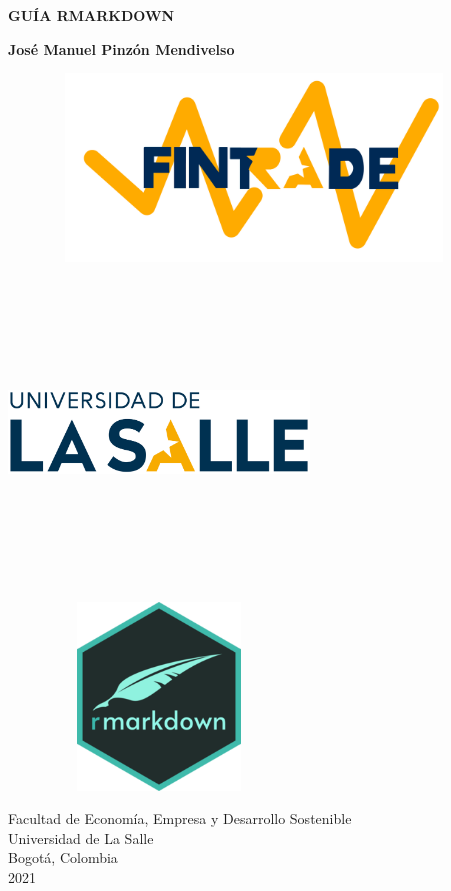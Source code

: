 \begin{titlepage}
    \begin{center}
        \vspace*{1cm}
            
        \Huge
        \textbf{GUÍA RMARKDOWN}
            
        \vspace{0.5cm}
        \LARGE
        \textbf{José Manuel Pinzón Mendivelso}
				
				\includegraphics[width=13cm,height=5cm]{Fintrade}    
            
            
        \vspace{0.5cm}
										
        \includegraphics[width=8cm,height=8cm]{LOGO}    

        \vspace{1.5cm}

        \includegraphics[width=8cm,height=5cm]{logo_rmd}
				
				\vfill
						
        \Large
        Facultad de Economía, Empresa y Desarrollo Sostenible\\
        Universidad de La Salle\\
        Bogotá, Colombia\\
        2021
            
    \end{center}
\end{titlepage}
